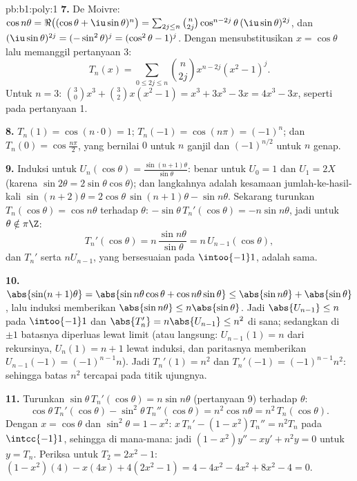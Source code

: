 \begin{solution}{pb:b1:poly:1}
\textbf{7.} De Moivre: $\cos n\theta = \Re\bigl((\cos\theta +
\iu\sin\theta)^n\bigr) = \sum_{2j \leq n}\binom n{2j}
\cos^{n-2j}\theta\,(\iu\sin\theta)^{2j}$, dan $(\iu\sin\theta)^{2j}
= (-\sin^2\theta)^j = (\cos^2\theta - 1)^j$. Dengan mensubstitusikan $x =
\cos\theta$ lalu memanggil pertanyaan 3:
\[
T_n(x) = \sum_{0\leq 2j\leq n}\binom n{2j}x^{n-2j}(x^2 - 1)^j .
\]
Untuk $n = 3$: $\binom30 x^3 + \binom32 x(x^2 - 1) = x^3 + 3x^3 -
3x = 4x^3 - 3x$, seperti pada pertanyaan 1.

\textbf{8.} $T_n(1) = \cos(n\cdot0) = 1$; $T_n(-1) = \cos(n\pi) =
(-1)^n$; dan $T_n(0) = \cos\frac{n\pi}2$, yang bernilai $0$ untuk $n$ ganjil dan
$(-1)^{n/2}$ untuk $n$ genap.

\textbf{9.} Induksi untuk $U_n(\cos\theta) =
\frac{\sin(n+1)\theta}{\sin\theta}$: benar untuk $U_0 = 1$ dan $U_1 =
2X$ (karena $\sin2\theta = 2\sin\theta\cos\theta$); dan langkahnya adalah
kesamaan jumlah-ke-hasil-kali $\sin(n+2)\theta = 2\cos\theta\,
\sin(n+1)\theta - \sin n\theta$. Sekarang turunkan
$T_n(\cos\theta) = \cos n\theta$ terhadap $\theta$:
$-\sin\theta\,T_n'(\cos\theta) = -n\sin n\theta$, jadi untuk $\theta
\notin \pi\Z$:
\[
T_n'(\cos\theta) = n\,\frac{\sin n\theta}{\sin\theta}
= n\,U_{n-1}(\cos\theta) ,
\]
dan  $T_n'$ serta $nU_{n-1}$, yang bersesuaian pada
$\intoo{-1}1$, adalah sama.

\textbf{10.} $\abs{\sin(n+1)\theta} = \abs{\sin n\theta\cos\theta
+ \cos n\theta\sin\theta} \leq \abs{\sin n\theta} +
\abs{\sin\theta}$, lalu induksi memberikan $\abs{\sin n\theta} \leq
n\abs{\sin\theta}$. Jadi $\abs{U_{n-1}} \leq n$ pada $\intoo{-1}1$
dan $\abs{T_n'} = n\abs{U_{n-1}} \leq n^2$ di sana; sedangkan di $\pm1$
batasnya diperluas lewat limit (atau langsung: $U_{n-1}(1) = n$ dari
rekursinya, $U_n(1) = n + 1$ lewat induksi, dan paritasnya memberikan
$U_{n-1}(-1) = (-1)^{n-1}n$). Jadi $T_n'(1) = n^2$ dan $T_n'(-1)
= (-1)^{n-1}n^2$: sehingga batas $n^2$ tercapai pada titik ujungnya.

\textbf{11.} Turunkan $\sin\theta\,T_n'(\cos\theta) = n\sin
n\theta$ (pertanyaan 9) terhadap $\theta$:
\[
\cos\theta\,T_n'(\cos\theta) - \sin^2\theta\,T_n''(\cos\theta)
= n^2\cos n\theta = n^2\,T_n(\cos\theta) .
\]
Dengan $x = \cos\theta$ dan $\sin^2\theta = 1 - x^2$: $x\,T_n' - (1
- x^2)T_n'' = n^2T_n$ pada $\intcc{-1}1$, sehingga di mana-mana:
jadi $(1 - x^2)y'' - xy' + n^2y = 0$ untuk $y = T_n$. Periksa untuk $T_2 =
2x^2 - 1$: $(1 - x^2)(4) - x(4x) + 4(2x^2 - 1) = 4 - 4x^2 - 4x^2
+ 8x^2 - 4 = 0$.


\end{solution}
